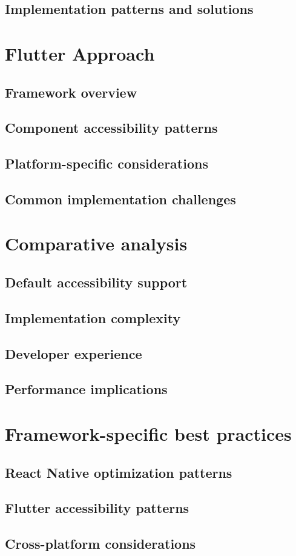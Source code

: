 \subsection {Implementation patterns and solutions}

\section {Flutter Approach}

\subsection{Framework overview}

\subsection {Component accessibility patterns}

\subsection {Platform-specific considerations}

\subsection {Common implementation challenges}

\section {Comparative analysis}

\subsection {Default accessibility support}

\subsection {Implementation complexity}

\subsection {Developer experience}

\subsection {Performance implications}

\section {Framework-specific best practices}

\subsection{React Native optimization patterns}

\subsection{Flutter accessibility patterns}

\subsection{Cross-platform considerations}

\newpage